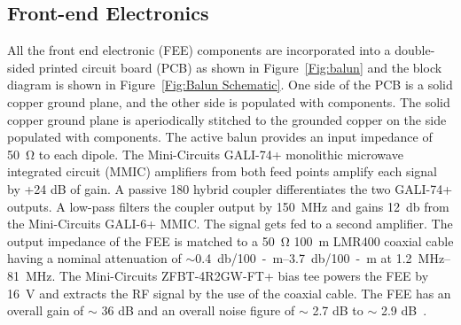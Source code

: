 \subsection{Front-end Electronics}\label{s:fee}

All the front end electronic (FEE) components are incorporated into a double-sided printed circuit board (PCB) as shown in Figure~\ref{Fig:balun} and the block diagram is shown in Figure~\ref{Fig:Balun Schematic}. One side of the PCB is a solid copper ground plane, and the other side is populated with components. The solid copper ground plane is aperiodically stitched to the grounded copper on the side populated with components. The active balun provides an input impedance of \SI{50}{\ohm} to each dipole. The Mini-Circuits GALI-74+ monolithic microwave integrated circuit (MMIC) amplifiers from both feed points amplify each signal by +24 dB of gain. A passive {180\degree} hybrid coupler differentiates the two GALI-74+ outputs. A low-pass filters the coupler output by \SI{150}{\mega\hertz} and gains \SI{12}{\decibel} from the Mini-Circuits GALI-6+ MMIC. The signal gets fed to a second amplifier. The output impedance of the FEE is matched to a \SI{50}{\ohm} \SI{100}{\meter} LMR400 coaxial cable having a nominal attenuation of $\sim$\SIrange{0.4}{3.7}{\decibel/100-m} at \SIrange{1.2}{81}{\mega\hertz}. The Mini-Circuits ZFBT-4R2GW-FT+ bias tee powers the FEE by \SI{16}{\volt} and extracts the RF signal by the use of the coaxial cable. The FEE has an overall gain of $\sim$ 36 dB and an overall noise figure of $\sim$ 2.7 dB to $\sim$ 2.9 dB~\citep{Memo35, 2012PASP..124.1090H}.

